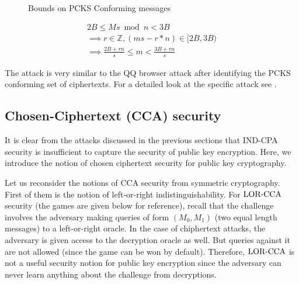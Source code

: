 \begin{figure} [H]
\centering
{}
\caption{Bounds on PCKS Conforming messages} \label{fig:PKCS1}
\end{figure}

\begin{align*}
	2B \leq Ms \bmod n < 3B \\
	\implies r \in \mathbb{Z}, (ms - r*n) \in [2B, 3B) \\
	\implies \frac{2B+rn}{s} \leq m < \frac{3B+rn}{s}
\end{align*}

The attack is very similar to the QQ browser attack after identifying the PCKS conforming set of ciphertexts. For a detailed look at the specific attack see \cite{BleichRSA}.

\subsection{Chosen-Ciphertext (CCA) security}
\indent It is clear from the attacks discussed in the previous sections that IND-CPA security is insufficient to capture the security of public key encryption. Here, we introduce the notion of chosen ciphertext security for public key cryptography. \newline

\indent Let us reconsider the notions of CCA security from symmetric cryptography. First of them is the notion of left-or-right indistinguishability. For $\textnormal{LOR-CCA}$ security (the games are given below for reference), recall that the challenge involves the adversary making queries of form $(M_0, M_1)$ (two equal length messages) to a left-or-right oracle. In the case of chiphertext attacks, the adversary is given access to the decryption oracle as well. But queries against it are not allowed (since the game can be won by default). Therefore, $\textnormal{LOR-CCA}$ is not a useful security notion for public key encryption since the adversary can never learn anything about the challenge from decryptions. \newline

